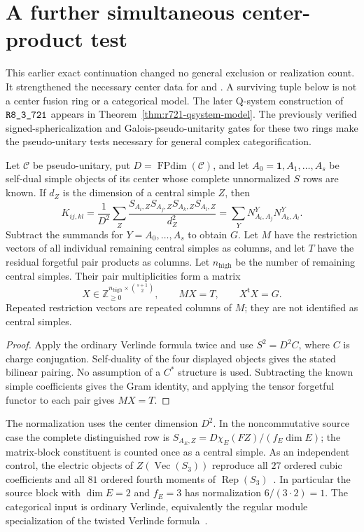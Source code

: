 \section{A further simultaneous center-product test}
\label{sec:center-product-followup}

This earlier exact continuation changed no general exclusion or
realization count. It strengthened the necessary center data for
 and .  A surviving tuple below
is not a center fusion ring or a categorical model. The later Q-system construction of $\sha{R8_3_721}$ appears in Theorem~\ref{thm:r721-qsystem-model}. The previously
verified signed-sphericalization and Galois-pseudo-unitarity gates for
these two rings make the pseudo-unitary tests necessary for general
complex categorification.

\begin{lemma}
\label{lem:followup-pair-gram}
Let $\mathcal C$ be pseudo-unitary, put $D=\operatorname{FPdim}(\mathcal C)$,
and let $A_0=\mathbf1,A_1,\ldots,A_s$ be self-dual simple objects of its
center whose complete unnormalized $S$ rows are known.  If $d_Z$ is the
dimension of a central simple $Z$, then
\[
 K_{ij,kl}=\frac1{D^2}\sum_Z
 \frac{S_{A_i,Z}S_{A_j,Z}S_{A_k,Z}S_{A_l,Z}}{d_Z^2}
 =\sum_Y N_{A_i,A_j}^{Y}N_{A_k,A_l}^{Y}.
\]
Subtract the summands for $Y=A_0,\ldots,A_s$ to obtain $G$.
Let $M$ have the restriction vectors of all individual remaining central
simples as columns, and let $T$ have the residual forgetful pair products
as columns. Let $n_{\mathrm{high}}$ be the number of remaining central simples. Their pair multiplicities form a matrix
\[
             X\in\mathbb Z_{\ge0}^{n_{\mathrm{high}}\times\binom{s+1}{2}},
             \qquad MX=T,\qquad X^{\mathsf t}X=G.
\]
Repeated restriction vectors are repeated columns of $M$; they are not
identified as central simples.
\end{lemma}

\begin{proof}
Apply the ordinary Verlinde formula twice and use
$S^2=D^2C$, where $C$ is charge conjugation.  Self-duality of the four
displayed objects gives the stated bilinear pairing.  No assumption
of a $C^*$ structure is used.  Subtracting the known simple coefficients
gives the Gram identity, and applying the tensor forgetful functor to
each pair gives $MX=T$.
\end{proof}

The normalization uses the center dimension $D^2$.  In the
noncommutative source case the complete distinguished row is
$S_{A_E,Z}=D\chi_E(FZ)/(f_E\dim E)$; the matrix-block constituent is
counted once as a central simple.  As an independent control, the
electric objects of $Z(\operatorname{Vec}(S_3))$ reproduce all $27$
ordered cubic coefficients and all $81$ ordered fourth moments of
$\operatorname{Rep}(S_3)$~\cite[Section~2.2]{CosteGannonRuelleFollowup}.  In particular the source block with
$\dim E=2$ and $f_E=3$ has normalization $6/(3\cdot2)=1$.
The categorical input is ordinary Verlinde, equivalently the regular
module specialization of the twisted Verlinde formula~\cite[Theorem~1.1]{DeshpandeVerlindeFollowup}.

